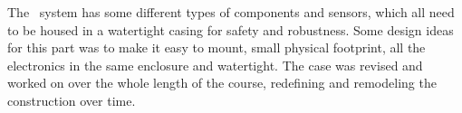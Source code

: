 
The \project~system has some different types of components and sensors, which all need to be housed in a watertight casing for safety and robustness. Some design ideas for this part was to make it easy to mount, small physical footprint, all the electronics in the same enclosure and watertight.
The case was revised and worked on over the whole length of the course, redefining and remodeling the construction over time.

